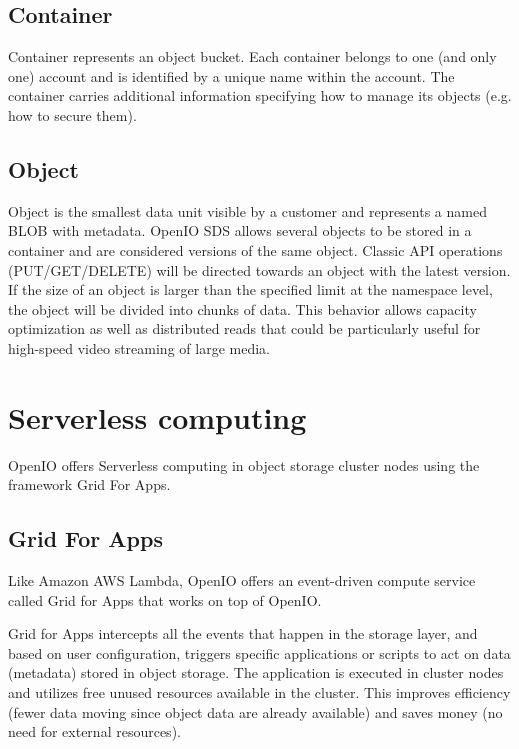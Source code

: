     \subsection{Container}
    Container represents an object bucket. Each container belongs to one (and only one) account and is identified by a unique name within the account. The container carries additional information specifying how to manage its objects (e.g. how to secure them)\cite{oioCoreSolution}.

    \subsection{Object}
    Object is the smallest data unit visible by a customer and represents a named BLOB with metadata. OpenIO SDS allows several objects to be stored in a container and are considered versions of the same object. Classic API operations (PUT/GET/DELETE) will be directed towards an object with the latest version. If the size of an object is larger than the specified limit at the namespace level, the object will be divided into chunks of data. This behavior allows capacity optimization as well as distributed reads that could be particularly useful for high-speed video streaming of large media\cite{oioCoreSolution}.


    \section{Serverless computing}
    OpenIO offers Serverless computing in object storage cluster nodes using the framework Grid For Apps.
    \subsection{Grid For Apps}\label{sec:oioGridForApps}

    Like Amazon AWS Lambda, OpenIO offers an event-driven compute service called Grid for Apps that works on top of OpenIO.

    Grid for Apps intercepts all the events that happen in the storage layer, and based on user configuration, triggers specific applications or scripts to act on data (metadata) stored in object storage\cite{oioNextGen}. The application is executed in cluster nodes and utilizes free unused resources available in the cluster. This improves efficiency (fewer data moving since object data are already available) and saves money (no need for external resources)\cite{oioNextGen}.

